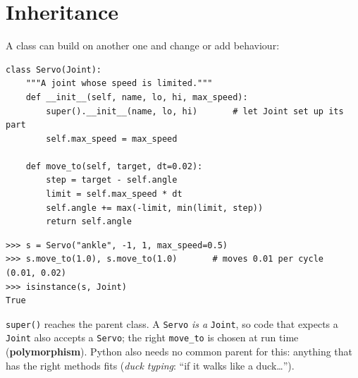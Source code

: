 \section*{Inheritance}
A class can build on another one and change or add behaviour:
\begin{verbatim}
class Servo(Joint):
    """A joint whose speed is limited."""
    def __init__(self, name, lo, hi, max_speed):
        super().__init__(name, lo, hi)       # let Joint set up its part
        self.max_speed = max_speed

    def move_to(self, target, dt=0.02):
        step = target - self.angle
        limit = self.max_speed * dt
        self.angle += max(-limit, min(limit, step))
        return self.angle
\end{verbatim}
\begin{verbatim}
>>> s = Servo("ankle", -1, 1, max_speed=0.5)
>>> s.move_to(1.0), s.move_to(1.0)       # moves 0.01 per cycle
(0.01, 0.02)
>>> isinstance(s, Joint)
True
\end{verbatim}
\begin{center}
\label{fig:py7_inh}
\end{center}
\texttt{super()} reaches the parent class. A \texttt{Servo} \emph{is a} \texttt{Joint}, so code that expects a \texttt{Joint} also accepts a \texttt{Servo}; the right \texttt{move\_to} is chosen at run time (\textbf{polymorphism}). Python also needs no common parent for this: anything that has the right methods fits (\emph{duck typing}: ``if it walks like a duck\dots'').

